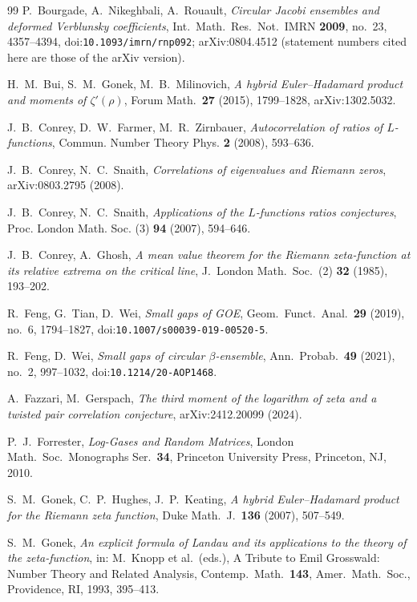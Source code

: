 \documentclass[12pt]{amsart}
\theoremstyle{remark}
\newcommand{\1}{\mathbf{1}}
\begin{document}
\begin{thebibliography}{99}
 P.~Bourgade, A.~Nikeghbali, A.~Rouault, \emph{Circular
Jacobi ensembles and deformed Verblunsky coefficients}, Int.\ Math.\ Res.\
Not.\ IMRN \textbf{2009}, no.~23, 4357--4394, doi:\nolinkurl{10.1093/imrn/rnp092};
arXiv:0804.4512 (statement numbers cited here are those of the arXiv
version).

 H.~M.~Bui, S.~M.~Gonek, M.~B.~Milinovich, \emph{A hybrid
Euler--Hadamard product and moments of $\zeta'(\rho)$}, Forum Math.\
\textbf{27} (2015), 1799--1828, arXiv:1302.5032.

 J.~B.~Conrey, D.~W.~Farmer, M.~R.~Zirnbauer,
\emph{Autocorrelation of ratios of $L$-functions}, Commun. Number Theory
Phys. \textbf{2} (2008), 593--636.

 J.~B.~Conrey, N.~C.~Snaith, \emph{Correlations of eigenvalues
and Riemann zeros}, arXiv:0803.2795 (2008).

 J.~B.~Conrey, N.~C.~Snaith, \emph{Applications of the
$L$-functions ratios conjectures}, Proc. London Math. Soc. (3) \textbf{94}
(2007), 594--646.

 J.~B.~Conrey, A.~Ghosh, \emph{A mean value theorem for the
Riemann zeta-function at its relative extrema on the critical line},
J.\ London Math.\ Soc.\ (2) \textbf{32} (1985), 193--202.

 R.~Feng, G.~Tian, D.~Wei, \emph{Small gaps of GOE},
Geom.\ Funct.\ Anal.\ \textbf{29} (2019), no.~6, 1794--1827,
doi:\nolinkurl{10.1007/s00039-019-00520-5}.

 R.~Feng, D.~Wei, \emph{Small gaps of circular
$\beta$-ensemble}, Ann.\ Probab.\ \textbf{49} (2021), no.~2, 997--1032,
doi:\nolinkurl{10.1214/20-AOP1468}.

 A.~Fazzari, M.~Gerspach, \emph{The third moment of the
logarithm of zeta and a twisted pair correlation conjecture},
arXiv:2412.20099 (2024).

 P.~J.~Forrester, \emph{Log-Gases and Random Matrices},
London Math.\ Soc.\ Monographs Ser.\ \textbf{34}, Princeton University
Press, Princeton, NJ, 2010.

 S.~M.~Gonek, C.~P.~Hughes, J.~P.~Keating, \emph{A hybrid
Euler--Hadamard product for the Riemann zeta function}, Duke Math.\ J.\
\textbf{136} (2007), 507--549.

\bibitem{Gonek93} S.~M.~Gonek, \emph{An explicit formula of Landau and its
applications to the theory of the zeta-function}, in: M.~Knopp et al.\
(eds.), A Tribute to Emil Grosswald: Number Theory and Related Analysis,
Contemp.\ Math.\ \textbf{143}, Amer.\ Math.\ Soc., Providence, RI, 1993,
395--413.


\end{thebibliography}
\end{document}
